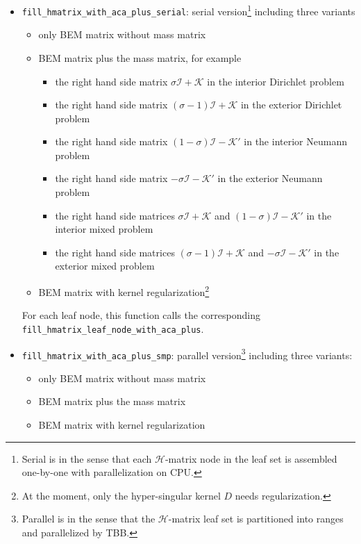 \documentclass[11pt, a4paper]{article}
\begin{document}
\begin{itemize}
\item \texttt{fill\_hmatrix\_with\_aca\_plus\_serial}: serial version\footnote{Serial is in the
    sense that each $\mathcal{H}$-matrix node in the leaf set is assembled one-by-one with
    parallelization on CPU.} including three variants
  \begin{itemize}
  \item only BEM matrix without mass matrix
  \item BEM matrix plus the mass matrix, for example
    \begin{itemize}
    \item the right hand side matrix $\sigma\mathscr{I}+\mathscr{K}$ in the interior
      Dirichlet problem
    \item the right hand side matrix $(\sigma-1)\mathscr{I}+\mathscr{K}$ in the exterior Dirichlet
      problem
    \item the right hand side matrix $(1-\sigma)\mathscr{I}-\mathscr{K}'$ in the interior Neumann
      problem
    \item the right hand side matrix $-\sigma \mathscr{I}-\mathscr{K}'$ in the exterior Neumann problem
    \item the right hand side matrices $\sigma \mathscr{I}+\mathscr{K}$ and
      $(1-\sigma)\mathscr{I}-\mathscr{K}'$ in the interior mixed problem
    \item the right hand side matrices $(\sigma-1)\mathscr{I}+\mathscr{K}$ and $-\sigma
      \mathscr{I}-\mathscr{K}'$ in the exterior mixed problem
    \end{itemize}
  \item BEM matrix with kernel regularization\footnote{At the moment, only the hyper-singular
      kernel $D$ needs regularization.}
  \end{itemize}
  For each leaf node, this function calls the corresponding \texttt{fill\_hmatrix\_leaf\_node\_with\_aca\_plus}.
\item \texttt{fill\_hmatrix\_with\_aca\_plus\_smp}: parallel version\footnote{Parallel is
    in the sense that the $\mathcal{H}$-matrix leaf set is partitioned into ranges and
    parallelized by TBB.} including three variants:
  \begin{itemize}
  \item only BEM matrix without mass matrix
  \item BEM matrix plus the mass matrix
  \item BEM matrix with kernel regularization
  \end{itemize}

\end{itemize}
\end{document}
